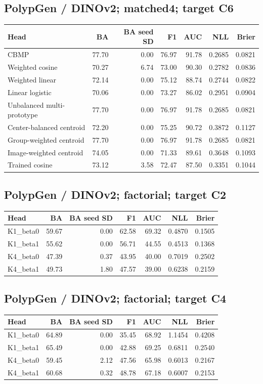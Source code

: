 \subsection*{PolypGen / DINOv2; matched4; target C6}
\begingroup\small\setlength{\tabcolsep}{3pt}
\begin{longtable}{lrrrrrr}
\toprule Head & BA & BA seed SD & F1 & AUC & NLL & Brier \\
\midrule
CBMP & 77.70 & 0.00 & 76.97 & 91.78 & 0.2685 & 0.0821 \\
Weighted cosine & 70.27 & 6.74 & 73.00 & 90.30 & 0.2782 & 0.0836 \\
Weighted linear & 72.14 & 0.00 & 75.12 & 88.74 & 0.2744 & 0.0822 \\
Linear logistic & 70.06 & 0.00 & 73.27 & 86.02 & 0.2951 & 0.0904 \\
Unbalanced multi-prototype & 77.70 & 0.00 & 76.97 & 91.78 & 0.2685 & 0.0821 \\
Center-balanced centroid & 72.20 & 0.00 & 75.25 & 90.72 & 0.3872 & 0.1127 \\
Group-weighted centroid & 77.70 & 0.00 & 76.97 & 91.78 & 0.2685 & 0.0821 \\
Image-weighted centroid & 74.05 & 0.00 & 71.33 & 89.61 & 0.3648 & 0.1093 \\
Trained cosine & 73.12 & 3.58 & 72.47 & 87.50 & 0.3351 & 0.1044 \\
\bottomrule
\end{longtable}
\endgroup
\subsection*{PolypGen / DINOv2; factorial; target C2}
\begingroup\small\setlength{\tabcolsep}{3pt}
\begin{longtable}{lrrrrrr}
\toprule Head & BA & BA seed SD & F1 & AUC & NLL & Brier \\
\midrule
K1\_beta0 & 59.67 & 0.00 & 62.58 & 69.32 & 0.4870 & 0.1505 \\
K1\_beta1 & 55.62 & 0.00 & 56.71 & 44.55 & 0.4513 & 0.1368 \\
K4\_beta0 & 47.39 & 0.37 & 43.95 & 40.00 & 0.7019 & 0.2502 \\
K4\_beta1 & 49.73 & 1.80 & 47.57 & 39.00 & 0.6238 & 0.2159 \\
\bottomrule
\end{longtable}
\endgroup
\subsection*{PolypGen / DINOv2; factorial; target C4}
\begingroup\small\setlength{\tabcolsep}{3pt}
\begin{longtable}{lrrrrrr}
\toprule Head & BA & BA seed SD & F1 & AUC & NLL & Brier \\
\midrule
K1\_beta0 & 64.89 & 0.00 & 35.45 & 68.92 & 1.1454 & 0.4208 \\
K1\_beta1 & 65.49 & 0.00 & 42.88 & 69.25 & 0.6811 & 0.2540 \\
K4\_beta0 & 59.45 & 2.12 & 47.56 & 65.98 & 0.6013 & 0.2167 \\
K4\_beta1 & 60.68 & 0.32 & 48.78 & 67.18 & 0.6007 & 0.2153 \\
\bottomrule
\end{longtable}
\endgroup
